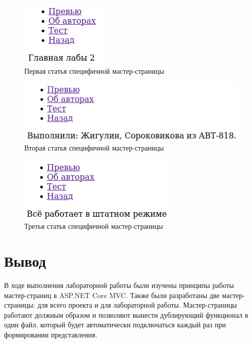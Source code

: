 \documentclass[a4paper,14pt]{extreport}
\begin{document}
\begin{figure}[H]
	\centering
	\includegraphics{02}
	\caption{Первая статья специфичной мастер-страницы}
\end{figure}

\begin{figure}[H]
	\centering
	\includegraphics{03}
	\caption{Вторая статья специфичной мастер-страницы}
\end{figure}
\begin{figure}[H]
	\centering
	\includegraphics{04}
	\caption{Третья статья специфичной мастер-страницы}
\end{figure}

\section{Вывод}
В ходе выполнения лабораторной работы были изучены принципы работы мастер-страниц в ASP.NET Core MVC. Также были разработаны две мастер-страницы: для всего проекта и для лабораторной работы. Мастер-страницы работают должным образом и позволяют вынести дублирующий функционал в один файл, который будет автоматически подключаться каждый раз при формировании представления.
\end{document}

